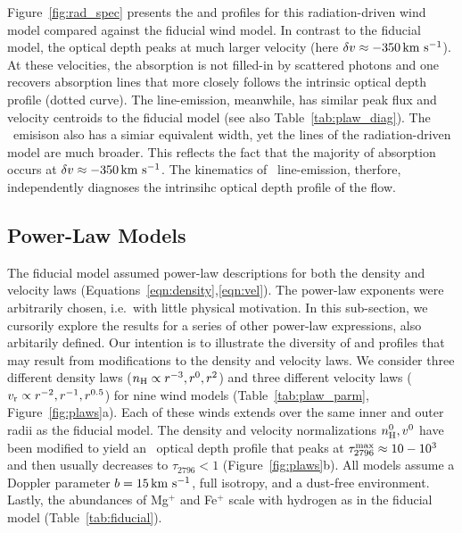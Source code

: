 \documentclass[12pt,preprint]{aastex}
\begin{document}
Figure~\ref{fig:rad_spec} presents the  and 
profiles for this radiation-driven wind model compared against the
fiducial wind model.
In contrast to the fiducial model, 
the optical depth peaks at much larger velocity (here $\delta v
\approx -350 \, {\rm km~s^{-1}}$).  At these velocities, the absorption is not
filled-in by scattered photons and one recovers absorption lines
that more closely follows the intrinsic optical depth profile (dotted
curve). The  line-emission, meanwhile, has
similar peak flux and velocity centroids to the fiducial model (see also
Table~\ref{tab:plaw_diag}).  The \feiis\ emisison also has a simiar
equivalent width, yet the lines of the radiation-driven model are much
broader. This reflects the fact that the majority of absorption
occurs at $\delta v \approx -350 \, {\rm km~s^{-1}}$.
The kinematics of \feiis\ line-emission, therfore, independently
diagnoses the intrinsihc optical depth profile of the flow.


\subsection{Power-Law Models}
\label{sec:power}

The fiducial model assumed power-law descriptions for both the density and velocity
laws (Equations~\ref{eqn:density},\ref{eqn:vel}).
The power-law exponents were arbitrarily chosen, i.e.\ with little physical
motivation.  In this sub-section, we cursorily explore the results for a series
of other power-law expressions, also arbitarily defined.
Our intention is to illustrate the diversity of  and
 profiles that may result from modifications to the density
and velocity laws.
We consider three different density laws ($n_{\rm H} \propto
r^{-3}, r^{0}, r^2$) and three different velocity laws ($v_{\rm r}
\propto r^{-2}, r^{-1}, r^{0.5}$) for nine wind models
(Table~\ref{tab:plaw_parm}, Figure~\ref{fig:plaws}a).  
Each of these winds extends over the same inner and outer radii as the
fiducial model.
The density and velocity normalizations $n_{\rm H}^0, v^0$ have been
modified to yield an \mgiia\ optical depth profile that peaks at
$\tau_{2796}^{\rm max} \approx 10-10^3$ and then usually decreases to
$\tau_{2796} < 1$ (Figure~\ref{fig:plaws}b). 
All models assume a Doppler parameter
$b=15\, {\rm km~s^{-1}}$, full isotropy, and a dust-free environment.
Lastly, the abundances of Mg$^+$ and Fe$^+$ scale with hydrogen as
in the fiducial model (Table~\ref{tab:fiducial}).
\end{document}
